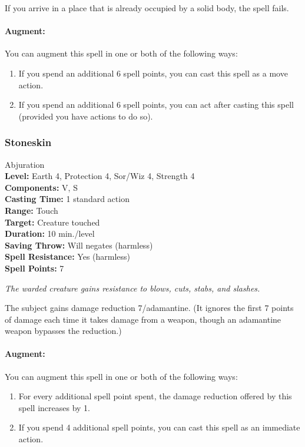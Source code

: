 If you arrive in a place that is already occupied by a solid body, the spell fails.

\paragraph{Augment:} You can augment this spell in one or both of the following ways:
\begin{enumerate}
 \item If you spend an additional 6 spell points, you can cast this spell as a move action.
 \item If you spend an additional 6 spell points, you can act after casting this spell (provided you have actions to do so).
\end{enumerate}

\subsubsection{Stoneskin}
\label{Spell:Stoneskin}
Abjuration
\\ \textbf{Level:} Earth 4, Protection 4, Sor/Wiz 4, Strength 4
\\ \textbf{Components:} V, S
\\ \textbf{Casting Time:} 1 standard action
\\ \textbf{Range:} Touch
\\ \textbf{Target:} Creature touched
\\ \textbf{Duration:} 10 min./level 
\\ \textbf{Saving Throw:} Will negates (harmless)
\\ \textbf{Spell Resistance:} Yes (harmless)
\\ \textbf{Spell Points:} 7

\emph{The warded creature gains resistance to blows, cuts, stabs, and slashes. }

The subject gains damage reduction 7/adamantine. 
(It ignores the first 7 points of damage each time it takes damage from a weapon, 
though an adamantine weapon bypasses the reduction.)

\paragraph{Augment:} You can augment this spell in one or both of the following ways:
\begin{enumerate}
 \item For every additional spell point spent, the damage reduction offered by this spell increases by 1.
 \item If you spend 4 additional spell points, you can cast this spell as an immediate action.
\end{enumerate}
